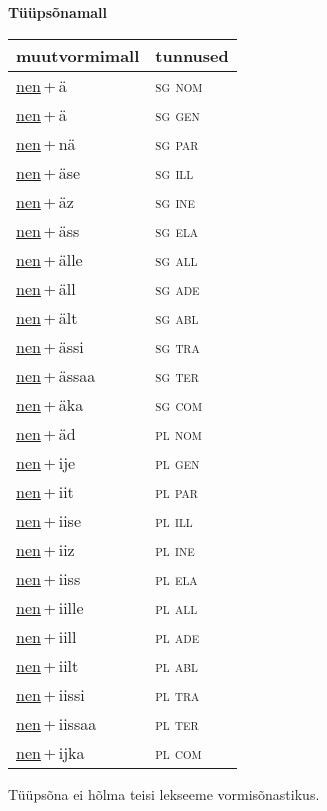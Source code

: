
\vspace{1.8em}
\begin{minipage}{\textwidth}
\textbf{Tüüpsõnamall \,}\\

\begin{sideways}
\begin{tabular}{l l}
muutvormimall & tunnused \\
\hline
\underline{nen}\,+\,ä & \textsc{ sg nom } \\
\underline{nen}\,+\,ä & \textsc{ sg gen } \\
\underline{nen}\,+\,nä & \textsc{ sg par } \\
\underline{nen}\,+\,äse & \textsc{ sg ill } \\
\underline{nen}\,+\,äz & \textsc{ sg ine } \\
\underline{nen}\,+\,äss & \textsc{ sg ela } \\
\underline{nen}\,+\,älle & \textsc{ sg all } \\
\underline{nen}\,+\,äll & \textsc{ sg ade } \\
\underline{nen}\,+\,ält & \textsc{ sg abl } \\
\underline{nen}\,+\,ässi & \textsc{ sg tra } \\
\underline{nen}\,+\,ässaa & \textsc{ sg ter } \\
\underline{nen}\,+\,äka & \textsc{ sg com } \\
\underline{nen}\,+\,äd & \textsc{ pl nom } \\
\underline{nen}\,+\,ije & \textsc{ pl gen } \\
\underline{nen}\,+\,iit & \textsc{ pl par } \\
\underline{nen}\,+\,iise & \textsc{ pl ill } \\
\underline{nen}\,+\,iiz & \textsc{ pl ine } \\
\underline{nen}\,+\,iiss & \textsc{ pl ela } \\
\underline{nen}\,+\,iille & \textsc{ pl all } \\
\underline{nen}\,+\,iill & \textsc{ pl ade } \\
\underline{nen}\,+\,iilt & \textsc{ pl abl } \\
\underline{nen}\,+\,iissi & \textsc{ pl tra } \\
\underline{nen}\,+\,iissaa & \textsc{ pl ter } \\
\underline{nen}\,+\,ijka & \textsc{ pl com } \\
\end{tabular}
\end{sideways}
\label{tab:tüüpsõnamall-nenä}

\end{minipage}

 
\vspace{1em}
\noindent Tüüpsõna ei hõlma teisi lekseeme vormi\-sõnastikus.
